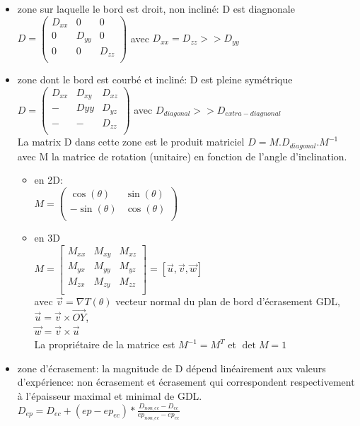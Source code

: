 \documentclass{article}
\begin{document}
	\begin{itemize}
		\item zone sur laquelle le bord est droit, non incliné: D est diagnonale \\
		$ D = \left( 
			\begin{matrix}
			D_{xx} & 0 & 0\\
			0 & D_{yy} & 0\\
			0 & 0 & D_{zz}\\
			\end{matrix} 
			\right) $
		avec $ D_{xx} = D_{zz} >> D_{yy} $
		\item zone dont le bord est courbé et incliné: D est pleine symétrique \\
		$ D = \left( 
		\begin{matrix}
		D_{xx} & D_{xy} & D_{xz}\\
		- & Dyy & D_{yz}\\
		- & - & D_{zz}\\
		\end{matrix} 
		\right) $ 
		avec $ D_{diagonal} >> D_{extra-diagnonal} $ \\
		La matrix D dans cette zone est le produit matriciel $D = M.D_{diagonal}.M^{-1}$ avec M la matrice de rotation (unitaire) en fonction de l'angle d'inclination.
		\begin{itemize}
			\item en 2D: \\ 
			$ M = \left( 
			\begin{matrix}
			\cos(\theta) & \sin(\theta)\\
			-\sin(\theta) & \cos(\theta)\\
			\end{matrix} 
			\right) $
			\item en 3D \\
			$ M = \left[ 
			\begin{matrix}
			M_{xx} & M_{xy} & M_{xz}\\
			M_{yx} & M_{yy} & M_{yz}\\
			M_{zx} & M_{zy} & M_{zz}\\
			\end{matrix} 
			\right]  
			= \left[ \vec{u}, \vec{v}, \vec{w} \right] $ \\
			avec $\vec{v} = \nabla T(\theta)$ vecteur normal du plan de bord d'écrasement GDL, \\ 
			$\vec{u} = \vec{v} \times \vec{OY}$, \\ 
			$\vec{w} = \vec{v} \times \vec{u}$ \\
			La propriétaire de la matrice est $ M^{-1} = M^T$ et $\det{M}=1$ \\
		\end{itemize} 
		
		\item zone d'écrasement: la magnitude de D dépend linéairement aux valeurs d'expérience: non écrasement et écrasement qui correspondent respectivement à l'épaisseur maximal et minimal de GDL. \\
		
		$ D_{ep} = D_{ec}+(ep-ep_{ec})*\frac{D_{non\_ec}-D_{ec}}{ep_{non\_ec}-ep_{ec}} $ \\
	\end{itemize}
	
\end{document}

